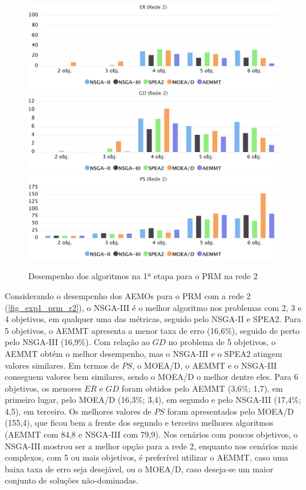 \begin{figure}[!htbp]	
	\includegraphics[width=1\textwidth]{cap_experimentos/figs/etapa1/er-mrp-r2}
	\includegraphics[width=1\textwidth]{cap_experimentos/figs/etapa1/gd-mrp-r2}
	\includegraphics[width=1\textwidth]{cap_experimentos/figs/etapa1/ps-mrp-r2}
	\caption{\label{fig_exp1_prm_r2}Desempenho dos algoritmos na 1ª etapa para o PRM na rede 2}
\end{figure}

Considerando o desempenho dos AEMOs para o PRM com a rede 2 (\autoref{fig_exp1_prm_r2}), o NSGA-III é o melhor algoritmo nos problemas com 2, 3 e 4 objetivos, em qualquer uma das métricas, seguido pelo NSGA-II e SPEA2. Para 5 objetivos, o AEMMT apresenta a menor taxa de erro (16,6\%), seguido de perto pelo NSGA-III (16,9\%). Com relação ao $GD$ no problema de 5 objetivos, o AEMMT obtém o melhor desempenho, mas o NSGA-III e o SPEA2 atingem valores similares. Em termos de $PS$, o MOEA/D, o AEMMT e o NSGA-III conseguem valores bem similares, sendo o MOEA/D o melhor dentre eles. Para 6 objetivos, os menores $ER$ e $GD$ foram obtidos pelo AEMMT (3,6\%; 1,7), em primeiro lugar, pelo MOEA/D (16,3\%; 3,4), em segundo e pelo NSGA-III (17,4\%; 4,5), em terceiro. Os melhores valores de $PS$ foram apresentados pelo MOEA/D (155,4), que ficou bem a frente dos segundo e terceiro melhores algoritmos (AEMMT com 84,8 e NSGA-III com 79,9). Nos cenários com poucos objetivos, o NSGA-III mostrou ser a melhor opção para a rede 2, enquanto nos cenários mais complexos, com 5 ou mais objetivos, é preferível utilizar o AEMMT, caso uma baixa taxa de erro seja desejável, ou o MOEA/D, caso deseja-se um maior conjunto de soluções não-dominadas.

